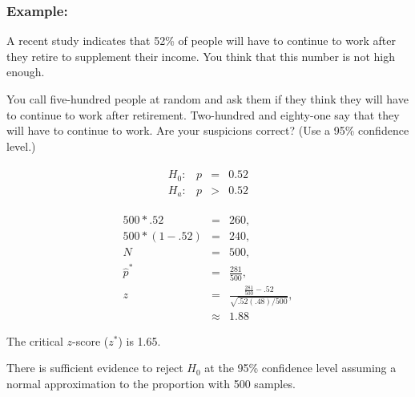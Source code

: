 \begin{frame}
  \frametitle{Example: }

  \vspace*{-2em}
  A recent study indicates that 52\% of people will have to continue
  to work after they retire to supplement their income. You think that
  this number is not high enough. 

  You call five-hundred people at random and ask them if they think
  they will have to continue to work after retirement. Two-hundred and
  eighty-one say that they will have to continue to work. Are your
  suspicions correct?  (Use a 95\% confidence level.)

  \vfill

  {
    \begin{eqnarray*}
      \begin{array}{lrcl}
        H_0: & p & = & 0.52 \\
        H_a: & p & > & 0.52
      \end{array}
    \end{eqnarray*}
  }

  {
    \begin{eqnarray*}
      500*.52     & = & 260, \\
      500*(1-.52) & = & 240, \\
      N & = & 500, \\
      \hat{p}^* & = & \frac{281}{500}, \\
      z & = & \frac{\frac{281}{500}-.52}{\sqrt{.52(.48)/500}}, \\
      & \approx & 1.88
    \end{eqnarray*}
  }
  

  {
    The critical $z$-score ($z^*$) is 1.65.
  }

  {

    {\color{red}
      There is sufficient evidence to reject $H_0$ at the 95\%
      confidence level assuming a normal approximation to the
      proportion with 500 samples.
    }

  }

  \vfill
  
\end{frame}


